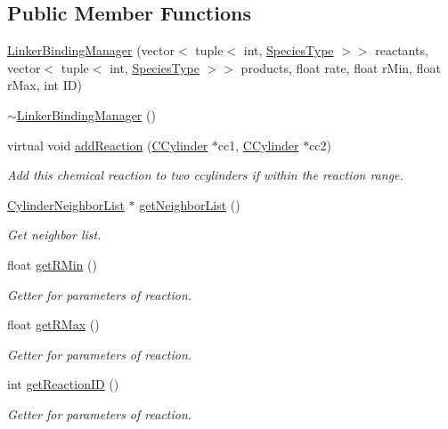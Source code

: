 \subsection*{Public Member Functions}
\begin{DoxyCompactItemize}
\item 
\hyperlink{classLinkerBindingManager_a363aaa58b31fbbd489aaa5490c0c7cfb}{Linker\+Binding\+Manager} (vector$<$ tuple$<$ int, \hyperlink{Species_8h_a50651af47c56ea0e27235468d23542cf}{Species\+Type} $>$$>$ reactants, vector$<$ tuple$<$ int, \hyperlink{Species_8h_a50651af47c56ea0e27235468d23542cf}{Species\+Type} $>$$>$ products, float rate, float r\+Min, float r\+Max, int I\+D)
\item 
\hyperlink{classLinkerBindingManager_aed39118397e9db9d845bd391b6c5320c}{$\sim$\+Linker\+Binding\+Manager} ()
\item 
virtual void \hyperlink{classLinkerBindingManager_abace6970973b31e9ffa8d903492bf638}{add\+Reaction} (\hyperlink{classCCylinder}{C\+Cylinder} $\ast$cc1, \hyperlink{classCCylinder}{C\+Cylinder} $\ast$cc2)
\begin{DoxyCompactList}\small\item\em Add this chemical reaction to two ccylinders if within the reaction range. \end{DoxyCompactList}\item 
\hyperlink{classCylinderNeighborList}{Cylinder\+Neighbor\+List} $\ast$ \hyperlink{classCylinderNLContainer_afce343b3251cf0ed087cf5a62fb6aaee}{get\+Neighbor\+List} ()
\begin{DoxyCompactList}\small\item\em Get neighbor list. \end{DoxyCompactList}\end{DoxyCompactItemize}
{\bf }\par
\begin{DoxyCompactItemize}
\item 
float \hyperlink{classCrossFilamentRxnManager_aeb9207c18bb40c33d9c8fe99a006401d}{get\+R\+Min} ()
\begin{DoxyCompactList}\small\item\em Getter for parameters of reaction. \end{DoxyCompactList}\item 
float \hyperlink{classCrossFilamentRxnManager_a7fa04502185124176a72fb2f3965c698}{get\+R\+Max} ()
\begin{DoxyCompactList}\small\item\em Getter for parameters of reaction. \end{DoxyCompactList}\item 
int \hyperlink{classCrossFilamentRxnManager_aa5527049ea757ea2b22fca486d3bf08d}{get\+Reaction\+I\+D} ()
\begin{DoxyCompactList}\small\item\em Getter for parameters of reaction. \end{DoxyCompactList}\end{DoxyCompactItemize}

